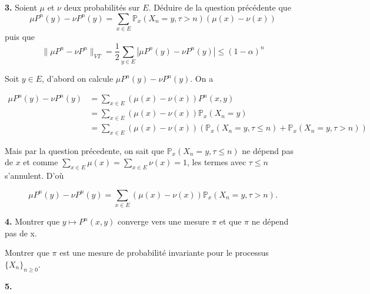 \documentclass[french]{article}
\begin{document}
	\begin{tcolorbox}[colback=gray!5!white,colframe=gray!75!black]
		\textbf{3.} Soient $\mu$ et $\nu$ deux probabilités sur $E$. Déduire de la question précédente que
		$$ \mu P^n(y) - \nu P^n(y) = \sum_{x \in E} \mathbb{P}_x(X_n = y, \tau > n)(\mu(x) - \nu(x)) $$
		puis que
		$$ \|\mu P^n - \nu P^n\|_{VT} = \frac{1}{2} \sum_{y \in E} |\mu P^n(y) - \nu P^n(y)| \leq (1 - \alpha)^n $$
	\end{tcolorbox}

	Soit $y \in E$, d'abord on calcule $\mu P^n(y) - \nu P^n(y)$. On a
	
	\begin{align}
		\mu P^n(y) - \nu P^n(y) & = \sum_{x \in E} (\mu(x) - \nu(x))P^n(x, y)\\
		&= \sum_{x \in E} (\mu(x) - \nu(x)) \mathbb{P}_x(X_n = y) \\
		&= \sum_{x \in E} (\mu(x) - \nu(x)) ( \mathbb{P}_x(X_n = y, \tau \leq n) + \mathbb{P}_x(X_n = y, \tau > n) )
	\end{align}
	
	Mais par la question précedente, on sait que $\mathbb{P}_x(X_n = y, \tau \leq n)$ ne dépend pas de $x$ et comme $\sum_{x \in E} \mu(x) = \sum_{x \in E} \nu(x) = 1$, les termes avec $\tau \leq n$ s'annulent. D'où
	
	$$ \mu P^n(y) - \nu P^n(y) = \sum_{x \in E} (\mu(x) - \nu(x)) \mathbb{P}_x(X_n = y, \tau > n). $$
	
	\begin{tcolorbox}[colback=gray!5!white,colframe=gray!75!black]
		\textbf{4.} Montrer que $y \mapsto P^n(x,y)$ converge vers une mesure $\pi$ et que $\pi$ ne dépend pas de x.
		
		Montrer que $\pi$ est une mesure de probabilité invariante pour le processus $\{X_n\}_{n \geq 0}$.
	\end{tcolorbox}



	\begin{tcolorbox}[colback=gray!5!white,colframe=gray!75!black]
		\textbf{5.} 
	\end{tcolorbox}
	
	
	
\end{document}
